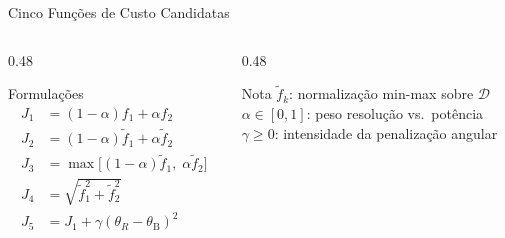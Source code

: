 \documentclass[aspectratio=169, 10pt]{beamer}
\newcommand{\thetaB}{\theta_{\mathrm{B}}}
\begin{document}
\begin{frame}{Cinco Funções de Custo Candidatas}
  \vspace{0.3em}
  \begin{columns}[T]
    \begin{column}{0.48\textwidth}
      \begin{block}{Formulações}
        \vspace{-0.3em}
        \begin{align*}
          J_1 &= (1{-}\alpha)f_1 + \alpha f_2 \\
          J_2 &= (1{-}\alpha)\tilde{f}_1 + \alpha \tilde{f}_2 \\
          J_3 &= \max\!\bigl[(1{-}\alpha)\tilde{f}_1,\;\alpha\tilde{f}_2\bigr] \\
          J_4 &= \sqrt{\tilde{f}_1^2 + \tilde{f}_2^2} \\
          J_5 &= J_1 + \gamma(\theta_R - \thetaB)^2
        \end{align*}
      \end{block}
    \end{column}
    \begin{column}{0.48\textwidth}
      \begin{block}{Nota}
        \small
        $\tilde{f}_k$: normalização min-max sobre $\mathcal{D}$\\[4pt]
        $\alpha \in [0,1]$: peso resolução vs.\ potência\\[4pt]
        $\gamma \geq 0$: intensidade da penalização angular
      \end{block}
    \end{column}
  \end{columns}
\end{frame}
\end{document}
